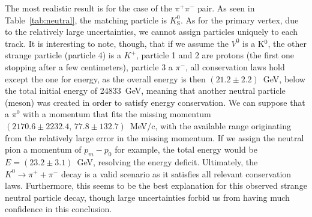 \documentclass[twocolumn]{article}
\begin{document}
The most realistic result is for the case of the $\pi^+ \pi^-$ pair. As seen in Table~\ref{tab:neutral}, the matching particle is $K^0_{\text{S}}$. As for the primary vertex, due to the relatively large uncertainties, we cannot assign particles uniquely to each track. It is interesting to note, though, that if we assume the $V^0$ is a K$^0$, the other strange particle (particle 4) is a $K^+$, particle 1 and 2 are protons (the first one stopping after a few centimeters), particle 3 a $\pi^-$, all conservation laws hold except the one for energy, as the overall energy is then $(21.2 \pm 2.2)$~GeV, below the total initial energy of 24833~GeV, meaning that another neutral particle (meson) was created in order to satisfy energy conservation. We can suppose that a $\pi^0$ with a momentum that fits the missing momentum $ (2170.6 \pm 2232.4,\, 77.8 \pm 132.7)$~MeV/c, with the available range originating from the relatively large error in the missing momentum. If we assign the neutral pion a momentum of $p_m - p_0$ for example, the total energy would be $E = (23.2 \pm 3.1)$~GeV, resolving the energy deficit. Ultimately, the $K^0 \to \pi^+ + \pi^-$ decay is a valid scenario as it satisfies all relevant conservation laws. Furthermore, this seems to be the best explanation for this observed strange neutral particle decay, though large uncertainties forbid us from having much confidence in this conclusion.
\end{document}
